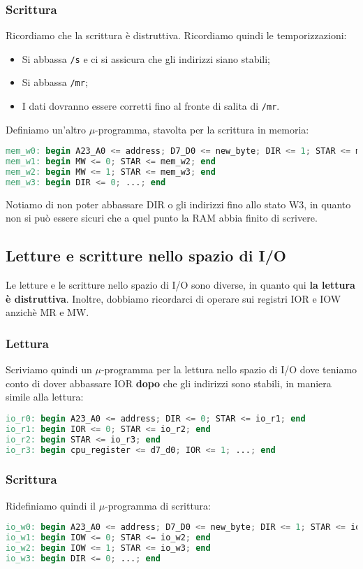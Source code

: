 \documentclass[a4paper,11pt]{article}
\begin{document}
\subsubsection{Scrittura}
Ricordiamo che la scrittura è distruttiva.
Ricordiamo quindi le temporizzazioni:
\begin{itemize}
	\item Si abbassa \lstinline|/s| e ci si assicura che gli indirizzi siano stabili;
	\item Si abbassa \lstinline|/mr|;
	\item I dati dovranno essere corretti fino al fronte di salita di \lstinline|/mr|.
\end{itemize}

Definiamo un'altro $\mu$-programma, stavolta per la scrittura in memoria:
\begin{lstlisting}[language=verilog, style=codestyle]	
mem_w0: begin A23_A0 <= address; D7_D0 <= new_byte; DIR <= 1; STAR <= mem_w1; end
mem_w1: begin MW <= 0; STAR <= mem_w2; end
mem_w2: begin MW <= 1; STAR <= mem_w3; end
mem_w3: begin DIR <= 0; ...; end
\end{lstlisting}
Notiamo di non poter abbassare DIR o gli indirizzi fino allo stato W3, in quanto non si può essere sicuri che a quel punto la RAM abbia finito di scrivere.

\subsection{Letture e scritture nello spazio di I/O}
Le letture e le scritture nello spazio di I/O sono diverse, in quanto qui \textbf{la lettura è distruttiva}.
Inoltre, dobbiamo ricordarci di operare sui registri IOR e IOW anzichè MR e MW.

\subsubsection{Lettura}
Scriviamo quindi un $\mu$-programma per la lettura nello spazio di I/O dove teniamo conto di dover abbassare IOR \textbf{dopo} che gli indirizzi sono stabili, in maniera simile alla lettura:
\begin{lstlisting}[language=verilog, style=codestyle]	
io_r0: begin A23_A0 <= address; DIR <= 0; STAR <= io_r1; end
io_r1: begin IOR <= 0; STAR <= io_r2; end
io_r2: begin STAR <= io_r3; end
io_r3: begin cpu_register <= d7_d0; IOR <= 1; ...; end
\end{lstlisting}

\subsubsection{Scrittura}
Ridefiniamo quindi il $\mu$-programma di scrittura:
\begin{lstlisting}[language=verilog, style=codestyle]	
io_w0: begin A23_A0 <= address; D7_D0 <= new_byte; DIR <= 1; STAR <= io_w1; end
io_w1: begin IOW <= 0; STAR <= io_w2; end
io_w2: begin IOW <= 1; STAR <= io_w3; end
io_w3: begin DIR <= 0; ...; end
\end{lstlisting}
\end{document}
